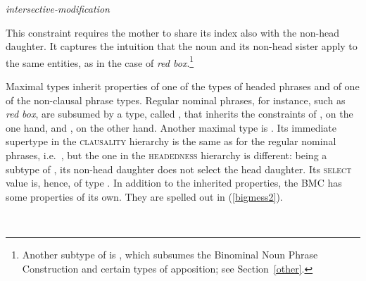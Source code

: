 \documentclass[output=paper,biblatex,babelshorthands,newtxmath,draftmode,colorlinks,citecolor=brown]{langscibook}
\begin{document}
\ea
\label{mononom} 
\emph{intersective-modification} \impl\\
\z

\noindent 
This constraint requires the mother to share its index also with the 
non-head daughter. It captures the intuition that the 
noun and its non-head sister apply to the same entities, as in 
the case of \emph{red box}.\footnote{Another subtype of  
is , which subsumes 
the Binominal Noun Phrase Construction and certain types of apposition;
see Section~\ref{other}.}  

Maximal types inherit properties of one of the types of headed phrases
and of one of the non-clausal phrase types.  
Regular nominal phrases, for instance, such as \emph{red box}, are subsumed 
by a type, called , that inherits the 
constraints of , on the one hand, and 
, on the other hand.  
Another maximal type is . 
Its immediate supertype in the \textsc{clausality} hierarchy is the same 
as for the regular nominal phrases, i.e.\ , 
but the one in the \textsc{headedness} hierarchy is different: 
being a subtype of , 
its non-head daughter does not select the head daughter. Its \textsc{select} 
value is, hence, of type . 
In addition to the inherited properties, the BMC has some properties of its own.   
They are spelled out in (\ref{bigmess2}).

\eas
\label{bigmess2}%
 \impl \\
\zs
\end{document}
